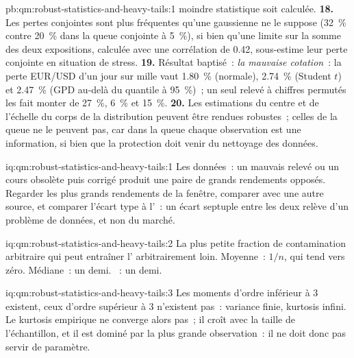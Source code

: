 \begin{solution}{pb:qm:robust-statistics-and-heavy-tails:1}
moindre statistique soit calculée.
\textbf{18.} Les pertes conjointes sont plus fréquentes qu'une  gaussienne ne le suppose (32~\% contre 20~\% dans la queue conjointe à 5~\%), si bien qu'une limite sur la somme des
deux expositions, calculée avec une corrélation de 0.42, sous-estime leur perte conjointe en situation de stress.
\textbf{19.} Résultat baptisé~: \emph{la mauvaise cotation}~: la perte EUR/USD d'un jour sur mille vaut 1.80~\% (normale), 2.74~\% (Student $t$) et 2.47~\%
(GPD au-delà du quantile à 95~\%)~; un seul relevé à chiffres permutés les fait monter de 27~\%, 6~\% et 15~\%.
\textbf{20.} Les estimations du centre et de l'échelle du corps de la distribution peuvent être rendues robustes~; celles de la queue ne le peuvent pas, car dans la queue chaque
observation est une information, si bien que la protection doit venir du nettoyage des données.
\end{solution}

\begin{solution}{iq:qm:robust-statistics-and-heavy-tails:1}
Les données~: un mauvais relevé ou un cours obsolète puis corrigé produit une paire de grands rendements opposés. Regarder les plus grands rendements de la fenêtre,
comparer avec une autre source, et comparer l'écart type à l'~: un écart septuple entre les deux relève d'un problème de données, et non du marché.
\end{solution}

\begin{solution}{iq:qm:robust-statistics-and-heavy-tails:2}
La plus petite fraction de contamination arbitraire qui peut entraîner l' arbitrairement loin. Moyenne~: $1/n$, qui tend vers zéro. Médiane~: un demi.
~: un demi.
\end{solution}

\begin{solution}{iq:qm:robust-statistics-and-heavy-tails:3}
Les moments d'ordre inférieur à 3 existent, ceux d'ordre supérieur à 3 n'existent pas~: variance finie, kurtosis infini. Le kurtosis empirique ne converge alors pas~; il croît avec
la taille de l'échantillon, et il est dominé par la plus grande observation~: il ne doit donc pas servir de paramètre.
\end{solution}

